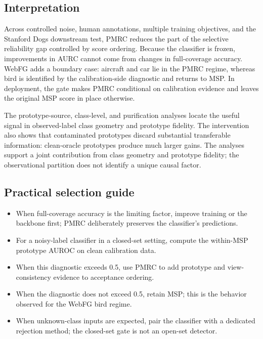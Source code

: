 \documentclass[review,times]{elsarticle}
\begin{document}
\subsection{Interpretation}

Across controlled noise, human annotations, multiple training objectives, and the Stanford Dogs downstream test, PMRC reduces the part of the selective reliability gap controlled by score ordering. Because the classifier is frozen, improvements in AURC cannot come from changes in full-coverage accuracy. WebFG adds a boundary case: aircraft and car lie in the PMRC regime, whereas bird is identified by the calibration-side diagnostic and returns to MSP. In deployment, the gate makes PMRC conditional on calibration evidence and leaves the original MSP score in place otherwise.

The prototype-source, class-level, and purification analyses locate the useful signal in observed-label class geometry and prototype fidelity. The intervention also shows that contaminated prototypes discard substantial transferable information: clean-oracle prototypes produce much larger gains. The analyses support a joint contribution from class geometry and prototype fidelity; the observational partition does not identify a unique causal factor.

\subsection{Practical selection guide}

\begin{itemize}
  \item When full-coverage accuracy is the limiting factor, improve training or the backbone first; PMRC deliberately preserves the classifier's predictions.
  \item For a noisy-label classifier in a closed-set setting, compute the within-MSP prototype AUROC on clean calibration data.
  \item When this diagnostic exceeds 0.5, use PMRC to add prototype and view-consistency evidence to acceptance ordering.
  \item When the diagnostic does not exceed 0.5, retain MSP; this is the behavior observed for the WebFG bird regime.
  \item When unknown-class inputs are expected, pair the classifier with a dedicated rejection method; the closed-set gate is not an open-set detector.
\end{itemize}
\end{document}
